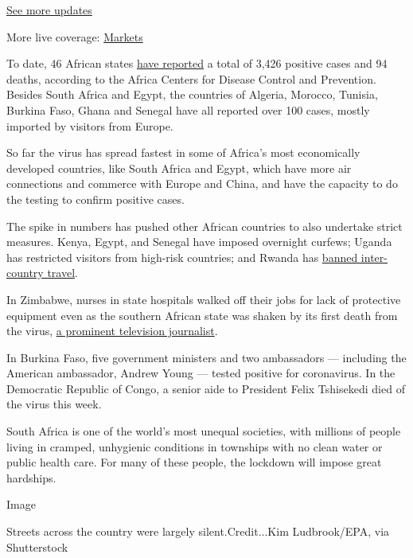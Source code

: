\href{https://www.nytimes.com/2020/08/01/world/coronavirus-covid-19.html?action=click\&pgtype=Article\&state=default\&region=MAIN_CONTENT_1\&context=storylines_live_updates}{See
more updates}

More live coverage:
\href{https://www.nytimes.com/live/2020/07/31/business/stock-market-today-coronavirus?action=click\&pgtype=Article\&state=default\&region=MAIN_CONTENT_1\&context=storylines_live_updates}{Markets}

To date, 46 African states
\href{https://twitter.com/AfricaCDC/status/1243555244572844037}{have
reported} a total of 3,426 positive cases and 94 deaths, according to
the Africa Centers for Disease Control and Prevention. Besides South
Africa and Egypt, the countries of Algeria, Morocco, Tunisia, Burkina
Faso, Ghana and Senegal have all reported over 100 cases, mostly
imported by visitors from Europe.

So far the virus has spread fastest in some of Africa's most
economically developed countries, like South Africa and Egypt, which
have more air connections and commerce with Europe and China, and have
the capacity to do the testing to confirm positive cases.

The spike in numbers has pushed other African countries to also
undertake strict measures. Kenya, Egypt, and Senegal have imposed
overnight curfews; Uganda has restricted visitors from high-risk
countries; and Rwanda has
\href{https://twitter.com/PrimatureRwanda/status/1241412264193937412}{banned
inter-country travel}.

In Zimbabwe, nurses in state hospitals walked off their jobs for lack of
protective equipment even as the southern African state was shaken by
its first death from the virus,
\href{https://www.cnn.com/2020/03/23/africa/zimbabwe-broadcaster-dies-coronavirus/index.html}{a
prominent television journalist}.

In Burkina Faso, five government ministers and two ambassadors ---
including the American ambassador, Andrew Young --- tested positive for
coronavirus. In the Democratic Republic of Congo, a senior aide to
President Felix Tshisekedi died of the virus this week.

South Africa is one of the world's most unequal societies, with millions
of people living in cramped, unhygienic conditions in townships with no
clean water or public health care. For many of these people, the
lockdown will impose great hardships.

Image

Streets across the country were largely silent.Credit...Kim
Ludbrook/EPA, via Shutterstock

